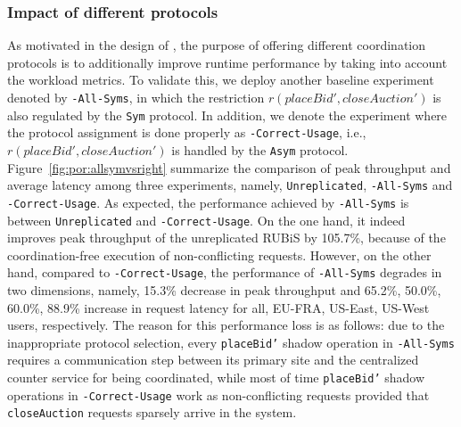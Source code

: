 \subsubsection{Impact of different protocols}
As motivated in the design of \coordtool, the purpose of offering different coordination protocols is
to additionally improve runtime performance by taking into account the workload metrics. To validate this, we deploy
another baseline experiment denoted by {\tt \coordtool-All-Syms}, in which the restriction $r(placeBid', closeAuction')$
is also regulated by the {\tt Sym} protocol. In addition, we denote the experiment where
the protocol assignment is done properly as {\tt \coordtool-Correct-Usage}, i.e., $r(placeBid', closeAuction')$ is handled
by the {\tt Asym} protocol. Figure~\ref{fig:por:allsymvsright} summarize the comparison of peak throughput and average latency among
three experiments, namely, {\tt Unreplicated}, {\tt \coordtool-All-Syms} and {\tt \coordtool-Correct-Usage}. As expected, the performance
achieved by {\tt \coordtool-All-Syms} is between {\tt Unreplicated} and {\tt \coordtool-Correct-Usage}. On the one hand,
it indeed improves peak throughput of the unreplicated RUBiS by 105.7\%, because of the coordination-free execution of non-conflicting
requests. However, on the other hand, compared to {\tt \coordtool-Correct-Usage}, the performance of {\tt \coordtool-All-Syms} degrades in
two dimensions, namely, 15.3\% decrease in peak throughput
and 65.2\%, 50.0\%, 60.0\%, 88.9\% increase in request latency for all, EU-FRA, US-East, US-West users, respectively. The reason for
this performance loss is as follows: due to the inappropriate protocol selection, every {\tt placeBid'} shadow operation in {\tt \coordtool-All-Syms} requires a communication
step between its primary site and the centralized counter service for being coordinated, while most of time {\tt placeBid'} shadow operations in 
{\tt \coordtool-Correct-Usage} work as non-conflicting requests provided that {\tt closeAuction} requests sparsely arrive in the system. 


